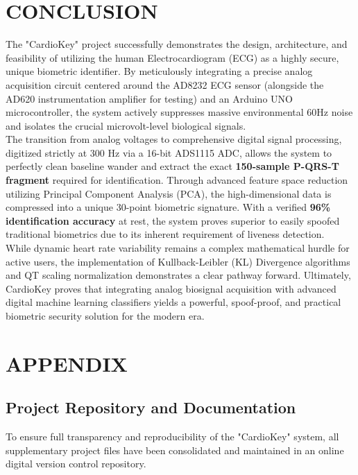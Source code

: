\documentclass[12pt,a4paper]{report}
\begin{document}
\chapter{CONCLUSION}
The "CardioKey" project successfully demonstrates the design, architecture, and feasibility of utilizing the human Electrocardiogram (ECG) as a highly secure, unique biometric identifier. By meticulously integrating a precise analog acquisition circuit centered around the AD8232 ECG sensor (alongside the AD620 instrumentation amplifier for testing) and an Arduino UNO microcontroller, the system actively suppresses massive environmental 60Hz noise and isolates the crucial microvolt-level biological signals. \\

The transition from analog voltages to comprehensive digital signal processing, digitized strictly at 300 Hz via a 16-bit ADS1115 ADC, allows the system to perfectly clean baseline wander and extract the exact \textbf{150-sample P-QRS-T fragment} required for identification. Through advanced feature space reduction utilizing Principal Component Analysis (PCA), the high-dimensional data is compressed into a unique 30-point biometric signature. With a verified \textbf{96\% identification accuracy} at rest, the system proves superior to easily spoofed traditional biometrics due to its inherent requirement of liveness detection. \\

While dynamic heart rate variability remains a complex mathematical hurdle for active users, the implementation of Kullback-Leibler (KL) Divergence algorithms and QT scaling normalization demonstrates a clear pathway forward. Ultimately, CardioKey proves that integrating analog biosignal acquisition with advanced digital machine learning classifiers yields a powerful, spoof-proof, and practical biometric security solution for the modern era.

\appendix
\chapter{APPENDIX}

\section{Project Repository and Documentation}
To ensure full transparency and reproducibility of the "CardioKey" system, all supplementary project files have been consolidated and maintained in an online digital version control repository. 
\end{document}
